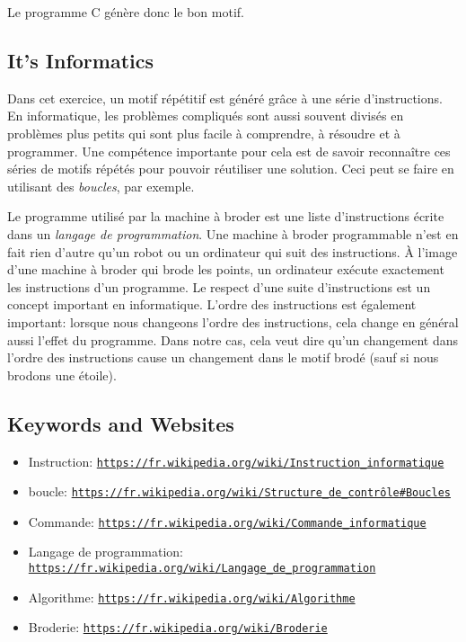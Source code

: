\documentclass[a4paper,11pt]{report}
\newcommand{\BrochureUrlText}[1]{\texttt{#1}}
\begin{document}
Le programme C génère donc le bon motif.


\subsection*{It’s Informatics}

Dans cet exercice, un motif répétitif est généré grâce à une série d’instructions. En informatique, les problèmes compliqués sont aussi souvent divisés en problèmes plus petits qui sont plus facile à comprendre, à résoudre et à programmer. Une compétence importante pour cela est de savoir reconnaître ces séries de motifs répétés pour pouvoir réutiliser une solution. Ceci peut se faire en utilisant des \emph{boucles}, par exemple.

Le programme utilisé par la machine à broder est une liste d’instructions écrite dans un \emph{langage de programmation}. Une machine à broder programmable n’est en fait rien d’autre qu’un robot ou un ordinateur qui suit des instructions. À l’image d’une machine à broder qui brode les points, un ordinateur exécute exactement les instructions d’un programme. Le respect d’une suite d’instructions est un concept important en informatique. L’ordre des instructions est également important: lorsque nous changeons l’ordre des instructions, cela change en général aussi l’effet du programme. Dans notre cas, cela veut dire qu’un changement dans l’ordre des instructions cause un changement dans le motif brodé (sauf si nous brodons une étoile).

{\raggedright

\subsection*{Keywords and Websites}

\begin{itemize}
  \item Instruction: \href{https://fr.wikipedia.org/wiki/Instruction_informatique}{\BrochureUrlText{https://fr.wikipedia.org/wiki/Instruction\_informatique}}
  \item boucle: \href{https://fr.wikipedia.org/wiki/Structure_de_contr\%C3\%B4le\#Boucles}{\BrochureUrlText{https://fr.wikipedia.org/wiki/Structure\_de\_contrôle\#Boucles}}
  \item Commande: \href{https://fr.wikipedia.org/wiki/Commande_informatique}{\BrochureUrlText{https://fr.wikipedia.org/wiki/Commande\_informatique}}
  \item Langage de programmation: \href{https://fr.wikipedia.org/wiki/Langage_de_programmation}{\BrochureUrlText{https://fr.wikipedia.org/wiki/Langage\_de\_programmation}}
  \item Algorithme: \href{https://fr.wikipedia.org/wiki/Algorithme}{\BrochureUrlText{https://fr.wikipedia.org/wiki/Algorithme}}
  \item Broderie: \href{https://fr.wikipedia.org/wiki/Broderie}{\BrochureUrlText{https://fr.wikipedia.org/wiki/Broderie}}
\end{itemize}


}
\end{document}
